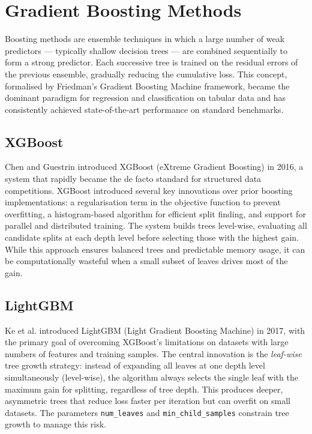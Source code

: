 
\section{Gradient Boosting Methods}

Boosting methods are ensemble techniques in which a large number of weak predictors — typically shallow decision trees — are combined sequentially to form a strong predictor. Each successive tree is trained on the residual errors of the previous ensemble, gradually reducing the cumulative loss. This concept, formalised by Friedman's Gradient Boosting Machine framework, became the dominant paradigm for regression and classification on tabular data and has consistently achieved state-of-the-art performance on standard benchmarks.

\subsection{XGBoost}

Chen and Guestrin \cite{chen2016xgboost} introduced XGBoost (eXtreme Gradient Boosting) in 2016, a system that rapidly became the de facto standard for structured data competitions. XGBoost introduced several key innovations over prior boosting implementations: a regularisation term in the objective function to prevent overfitting, a histogram-based algorithm for efficient split finding, and support for parallel and distributed training. The system builds trees level-wise, evaluating all candidate splits at each depth level before selecting those with the highest gain. While this approach ensures balanced trees and predictable memory usage, it can be computationally wasteful when a small subset of leaves drives most of the gain.

\subsection{LightGBM}

Ke et al. \cite{ke2017lightgbm} introduced LightGBM (Light Gradient Boosting Machine) in 2017, with the primary goal of overcoming XGBoost's limitations on datasets with large numbers of features and training samples. The central innovation is the \textit{leaf-wise} tree growth strategy: instead of expanding all leaves at one depth level simultaneously (level-wise), the algorithm always selects the single leaf with the maximum gain for splitting, regardless of tree depth. This produces deeper, asymmetric trees that reduce loss faster per iteration but can overfit on small datasets. The parameters \texttt{num\_leaves} and \texttt{min\_child\_samples} constrain tree growth to manage this risk.

